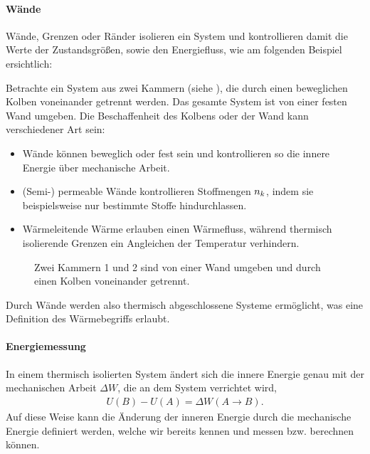 \paragraph*{Wände}

Wände, Grenzen oder Ränder isolieren ein System und kontrollieren damit die Werte der Zustandsgrößen, sowie den Energiefluss, wie am folgenden Beispiel ersichtlich:

Betrachte ein System aus zwei Kammern (siehe ), die durch einen beweglichen Kolben voneinander getrennt werden. Das gesamte System ist von einer festen Wand umgeben. Die Beschaffenheit des Kolbens oder der Wand kann verschiedener Art sein:
\begin{itemize}
    \item Wände können beweglich oder fest sein und kontrollieren so die innere Energie über mechanische Arbeit.
    \item (Semi-) permeable Wände kontrollieren Stoffmengen $n_k$, indem sie beispielsweise nur bestimmte Stoffe hindurchlassen.
    \item Wärmeleitende Wärme erlauben einen Wärmefluss, während thermisch isolierende Grenzen ein Angleichen der Temperatur verhindern.
\end{itemize}

\begin{figure}[htb]
    \centering
    \tfigTwoChambersSeparatedByPiston
    \caption{Zwei Kammern 1 und 2 sind von einer Wand umgeben und durch einen Kolben voneinander getrennt. }
    \label{fig:TwoChambersSeparatedByPiston}
\end{figure}

Durch Wände werden also thermisch abgeschlossene Systeme ermöglicht, was eine Definition des Wärmebegriffs erlaubt.


\paragraph*{Energiemessung}

In einem thermisch isolierten System ändert sich die innere Energie genau mit der mechanischen Arbeit $\Delta W$, die an dem System verrichtet wird,
\begin{align*}
    U(B)-U(A) =\Delta W(A\rightarrow B).
\end{align*}
Auf diese Weise kann die Änderung der inneren Energie durch die mechanische Energie definiert werden, welche wir bereits kennen und messen bzw. berechnen können.

